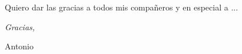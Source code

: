 


\begin{acknowledgements}      

Quiero dar las gracias a todos mis compañeros y en especial a ...


\begin{flushright}
\textit{Gracias,}

Antonio

\monthname \ \the\year







\end{flushright}



\end{acknowledgements}




